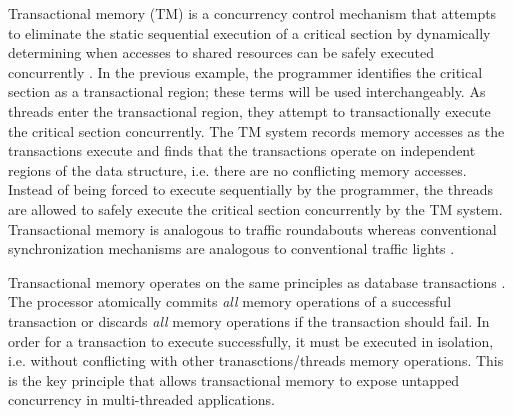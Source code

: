 \documentclass[a4paper]{article}
\begin{document}
\indent
Transactional memory (TM) is a concurrency control mechanism that attempts to
eliminate the static sequential execution of a critical section by dynamically
determining when accesses to shared resources can be safely executed
concurrently \cite{sle_rajwar}.  In the previous example, the programmer
identifies the critical section as a transactional region; these terms will be
used interchangeably.  As threads enter the transactional region, they attempt
to transactionally execute the critical section concurrently.  The TM system
records memory accesses as the transactions execute and finds that the
transactions operate on independent regions of the data structure, i.e. there
are no conflicting memory accesses.  Instead of being forced to execute
sequentially by the programmer, the threads are allowed to safely execute the
critical section concurrently by the TM system.  Transactional memory is
analogous to traffic roundabouts whereas conventional synchronization mechanisms
are analogous to conventional traffic lights \cite{neuling_vid}.
\par

\indent 
Transactional memory operates on the same principles as database
transactions \cite{tm_2nd}.  The processor atomically commits \textit{all}
memory operations of a successful transaction or discards \textit{all} memory
operations if the transaction should fail.  In order for a transaction to execute
successfully, it must be executed in isolation, i.e. without conflicting with
other tranasctions/threads memory operations.  This is the key principle that
allows transactional memory to expose untapped concurrency in multi-threaded
applications.
\par 
\end{document}
